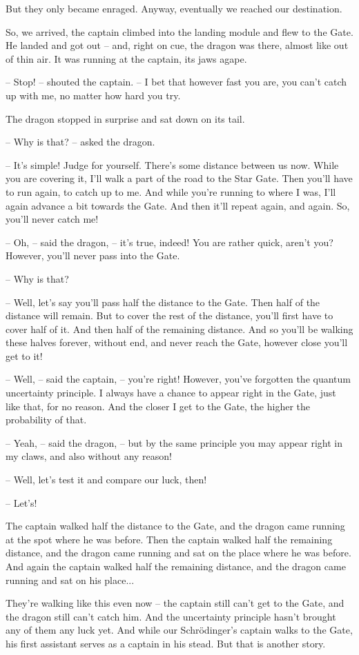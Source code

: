 \documentclass[ebook,oneside,final,openright]{memoir}
\begin{document}
 But they only became enraged. Anyway, eventually we reached our destination.\par
\par
So, we arrived, the captain climbed into the landing module and flew to the Gate. He landed and got out – and, right on cue, the dragon was there, almost like out of thin air. It was running at the captain, its jaws agape.\par
– Stop! – shouted the captain. – I bet that however fast you are, you can’t catch up with me, no matter how hard you try.\par
The dragon stopped in surprise and sat down on its tail.\par
– Why is that? – asked the dragon.\par
– It’s simple! Judge for yourself. There’s some distance between us now. While you are covering it, I’ll walk a part of the road to the Star Gate. Then you’ll have to run again, to catch up to me. And while you’re running to where I was, I’ll again advance a bit towards the Gate. And then it’ll repeat again, and again. So, you’ll never catch me!\par
– Oh, – said the dragon, – it’s true, indeed! You are rather quick, aren’t you? However, you’ll never pass into the Gate.\par
– Why is that?\par
– Well, let’s say you’ll pass half the distance to the Gate. Then half of the distance will remain. But to cover the rest of the distance, you’ll first have to cover half of it. And then half of the remaining distance. And so you’ll be walking these halves forever, without end, and never reach the Gate, however close you’ll get to it!\par
– Well, – said the captain, – you’re right! However, you’ve forgotten the quantum uncertainty principle. I always have a chance to appear right in the Gate, just like that, for no reason. And the closer I get to the Gate, the higher the probability of that.\par
– Yeah, – said the dragon, – but by the same principle you may appear right in my claws, and also without any reason!\par
– Well, let’s test it and compare our luck, then!\par
– Let’s!\par
\par
The captain walked half the distance to the Gate, and the dragon came running at the spot where he was before. Then the captain walked half the remaining distance, and the dragon came running and sat on the place where he was before. And again the captain walked half the remaining distance, and the dragon came running and sat on his place...\par
\par
They’re walking like this even now – the captain still can’t get to the Gate, and the dragon still can’t catch him. And the uncertainty principle hasn’t brought any of them any luck yet. And while our Schrödinger’s captain walks to the Gate, his first assistant serves as a captain in his stead. But that is another story.
\end{document}
